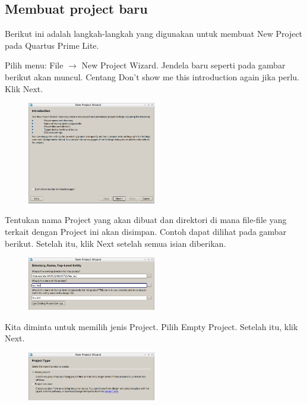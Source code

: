 \subsection{Membuat project baru}
Berikut ini adalah langkah-langkah yang digunakan untuk membuat New Project
pada Quartus Prime Lite.

Pilih menu: {\sf File $\rightarrow$ New Project Wizard}.
Jendela baru seperti pada gambar berikut akan
muncul.
Centang {\sf Don't show me this introduction again} jika perlu.
Klik {\sf Next}.
\begin{figure}[H]
\centering
\includegraphics[width=0.5\textwidth]{images/NewProjectWizard_1.png}
\par
\end{figure}


Tentukan nama Project yang akan dibuat dan direktori di
mana file-file yang terkait dengan Project ini akan disimpan. Contoh
dapat dilihat pada gambar berikut. Setelah itu, klik {\sf Next}
setelah semua isian diberikan.

\begin{figure}[H]
\centering
\includegraphics[width=0.5\textwidth]{images/NewProjectWizard_2.png}
\par
\end{figure}


Kita diminta untuk memilih jenis Project. Pilih {\sf Empty Project}.
Setelah itu, klik {\sf Next}.

\begin{figure}[H]
\centering
\includegraphics[width=0.5\textwidth]{images/NewProjectWizard_3.png}
\par
\end{figure}


